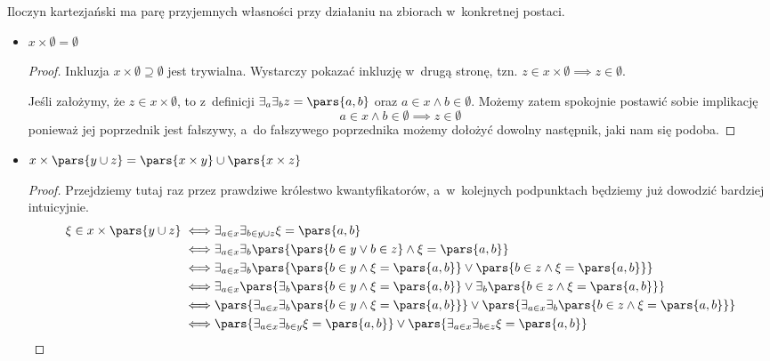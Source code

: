 Iloczyn kartezjański ma parę przyjemnych własności przy działaniu na zbiorach w~konkretnej postaci.
\begin{itemize}
    \item \(x \times \emptyset = \emptyset\)
        \begin{proof}
            Inkluzja \(x \times \emptyset \supseteq \emptyset\) jest trywialna. Wystarczy pokazać inkluzję w~drugą stronę, tzn. \(z \in x \times \emptyset \implies z \in \emptyset\). 
            
            Jeśli założymy, że \(z \in x \times \emptyset\), to z~definicji \(\exists_a\exists_b z = \pars{a, b}\) oraz \(a \in x \land b \in \emptyset\). Możemy zatem spokojnie postawić sobie implikację
            \begin{equation*}
                a \in x \land b \in \emptyset \implies z \in \emptyset
            \end{equation*}
            ponieważ jej poprzednik jest fałszywy, a~do fałszywego poprzednika możemy dołożyć dowolny następnik, jaki nam się podoba.
        \end{proof}
    \item \(x \times \pars{y \cup z} = \pars{x \times y} \cup \pars{x \times z}\)
        \begin{proof}
            Przejdziemy tutaj raz przez prawdziwe królestwo kwantyfikatorów, a~w~kolejnych podpunktach będziemy już dowodzić bardziej intuicyjnie.
            \begin{equation*}
                \begin{split}
                    \xi \in x \times \pars{y \cup z}
                        \iff& \exists_{a \in x}\exists_{b \in y \cup z} \xi = \pars{a, b}\\
                        \iff& \exists_{a \in x}\exists_b\pars{\pars{b \in y \lor b \in z} \land \xi = \pars{a, b}}\\
                        \iff& \exists_{a \in x}\exists_b\pars{\pars{b \in y \land \xi = \pars{a, b}} \lor \pars{b \in z \land \xi = \pars{a, b}}}\\
                        \iff& \exists_{a \in x}\pars{\exists_b\pars{b \in y \land \xi = \pars{a, b}} \lor \exists_b\pars{b \in z \land \xi = \pars{a, b}}}\\
                        \iff& \pars{\exists_{a \in x}\exists_b\pars{b \in y \land \xi = \pars{a, b}}} \lor \pars{\exists_{a \in x}\exists_b\pars{b \in z \land \xi = \pars{a, b}}}\\
                        \iff& \pars{\exists_{a \in x}\exists_{b \in y}\xi = \pars{a, b}} \lor \pars{\exists_{a \in x}\exists_{b \in z}\xi = \pars{a, b}}\\

\end{split}
\end{equation*}
\end{proof}
\end{itemize}
